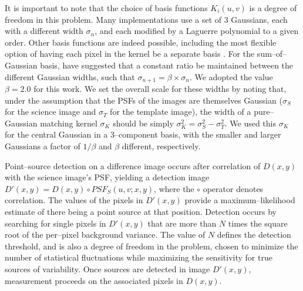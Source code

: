 \documentclass[iop]{emulateapj}
\begin{document}
It is important to note that the choice of basis functions $K_i(u,v)$ is a degree of freedom in this problem.
Many implementations \citep{1998ApJ...503..325A,2000A&AS..144..363A} use a set of 3 Gaussians, each with a different width $\sigma_n$, and each modified by a Laguerre polynomial to a given order.
Other basis functions are indeed possible, including the most flexible option of having each pixel in the kernel be a separate basis \citep{2008MNRAS.386L..77B,2009MNRAS.397.2099A,2012MNRAS.425.1341B}.
For the sum--of--Gaussian basis, \cite{2007AN....328...16I} have suggested that a constant ratio be maintained between the different Gaussian widths, such that $\sigma_{n+1} = \beta \times \sigma_{n}$.
We adopted the value $\beta = 2.0$ for this work.
We set the overall scale for these widths by noting that, under the assumption that the PSFs of the images are themselves Gaussian ($\sigma_S$ for the science image and $\sigma_T$ for the template image), the width of a pure--Gaussian matching kernel $\sigma_K$ should be simply $\sigma_K^2 = \sigma_S^2 - \sigma_T^2$.
We used this $\sigma_K$ for the central Gaussian in a 3--component basis, with the smaller and larger Gaussians a factor of $1/\beta$ and $\beta$ different, respectively.

Point--source detection on a difference image occurs after correlation of $D(x,y)$ with the science image's PSF, yielding a detection image $D'(x,y) = D(x,y) \circ PSF_S(u,v;x,y)$, where the $\circ$ operator denotes correlation.
The values of the pixels in $D'(x,y)$ provide a maximum--likelihood estimate of there being a point source at that position.
Detection occurs by searching for single pixels in $D'(x,y)$ that are more than $N$ times the square root of the per--pixel background variance.
The value of $N$ defines the detection threshold, and is also a degree of freedom in the problem, chosen to minimize the number of statistical fluctuations while maximizing the sensitivity for true sources of variability.
Once sources are detected in image $D'(x,y)$, measurement proceeds on the associated pixels in $D(x,y)$.
\end{document}
